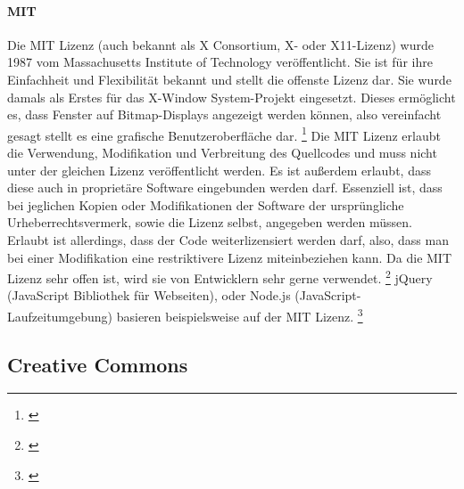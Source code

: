 \documentclass[titlepage,12pt,twoside]{article}
\begin{document}
\paragraph{MIT}
\label{par:MIT}
\hfill \break
\hfill \break
Die MIT Lizenz (auch bekannt als X Consortium, X- oder X11-Lizenz) wurde 1987 vom Massachusetts Institute of Technology veröffentlicht. Sie ist für ihre Einfachheit und Flexibilität bekannt und stellt die offenste 
Lizenz dar. Sie wurde damals als Erstes für das X-Window System-Projekt eingesetzt. Dieses ermöglicht es, dass Fenster auf Bitmap-Displays angezeigt werden können, also vereinfacht gesagt stellt es eine grafische 
Benutzeroberfläche dar. \footnote{\cite{Holton1}} Die MIT Lizenz erlaubt die Verwendung, Modifikation und Verbreitung des Quellcodes und muss nicht unter der gleichen Lizenz veröffentlicht werden. Es ist außerdem erlaubt, dass diese auch 
in proprietäre Software eingebunden werden darf. Essenziell ist, dass bei jeglichen Kopien oder Modifikationen der Software der ursprüngliche Urheberrechtsvermerk, sowie die Lizenz selbst, angegeben werden müssen. 
Erlaubt ist allerdings, dass der Code weiterlizensiert werden darf, also, dass man bei einer Modifikation eine restriktivere Lizenz miteinbeziehen kann. Da die MIT Lizenz sehr offen ist, wird sie von Entwicklern sehr 
gerne verwendet. \footnote{\cite{Holton2}} jQuery (JavaScript Bibliothek für Webseiten), oder Node.js (JavaScript-Laufzeitumgebung) basieren beispielsweise auf der MIT Lizenz. \footnote{\cite{Holton3}}

\subsection{Creative Commons}
\end{document}
